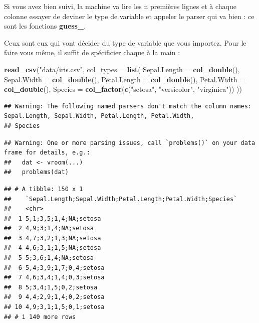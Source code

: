 \documentclass[
]{book}
\newenvironment{Shaded}{\begin{snugshade}}{\end{snugshade}}
\newcommand{\AttributeTok}[1]{\textcolor[rgb]{0.13,0.29,0.53}{#1}}
\newcommand{\FunctionTok}[1]{\textcolor[rgb]{0.13,0.29,0.53}{\textbf{#1}}}
\newcommand{\NormalTok}[1]{#1}
\newcommand{\StringTok}[1]{\textcolor[rgb]{0.31,0.60,0.02}{#1}}
\begin{document}
Si vous avez bien suivi, la machine va lire les n premières lignes et à chaque
colonne essayer de deviner le type de variable et appeler le parser qui va
bien : ce sont les fonctions \textbf{guess\_}.

Ceux sont eux qui vont décider du type de variable que vous importez. Pour le
faire vous même, il suffit de spécificier chaque à la main :

\begin{Shaded}
\begin{Highlighting}[]
\FunctionTok{read\_csv}\NormalTok{(}\StringTok{"data/iris.csv"}\NormalTok{, }\AttributeTok{col\_types =} \FunctionTok{list}\NormalTok{(}
  \AttributeTok{Sepal.Length =} \FunctionTok{col\_double}\NormalTok{(),}
  \AttributeTok{Sepal.Width =} \FunctionTok{col\_double}\NormalTok{(),}
  \AttributeTok{Petal.Length =} \FunctionTok{col\_double}\NormalTok{(),}
  \AttributeTok{Petal.Width =} \FunctionTok{col\_double}\NormalTok{(),}
  \AttributeTok{Species =} \FunctionTok{col\_factor}\NormalTok{(}\FunctionTok{c}\NormalTok{(}\StringTok{"setosa"}\NormalTok{, }\StringTok{"versicolor"}\NormalTok{, }\StringTok{"virginica"}\NormalTok{))}
\NormalTok{))}
\end{Highlighting}
\end{Shaded}

\begin{verbatim}
## Warning: The following named parsers don't match the column names: Sepal.Length, Sepal.Width, Petal.Length, Petal.Width,
## Species
\end{verbatim}

\begin{verbatim}
## Warning: One or more parsing issues, call `problems()` on your data frame for details, e.g.:
##   dat <- vroom(...)
##   problems(dat)
\end{verbatim}

\begin{verbatim}
## # A tibble: 150 x 1
##    `Sepal.Length;Sepal.Width;Petal.Length;Petal.Width;Species`
##    <chr>                                                      
##  1 5,1;3,5;1,4;NA;setosa                                      
##  2 4,9;3;1,4;NA;setosa                                        
##  3 4,7;3,2;1,3;NA;setosa                                      
##  4 4,6;3,1;1,5;NA;setosa                                      
##  5 5;3,6;1,4;NA;setosa                                        
##  6 5,4;3,9;1,7;0,4;setosa                                     
##  7 4,6;3,4;1,4;0,3;setosa                                     
##  8 5;3,4;1,5;0,2;setosa                                       
##  9 4,4;2,9;1,4;0,2;setosa                                     
## 10 4,9;3,1;1,5;0,1;setosa                                     
## # i 140 more rows
\end{verbatim}
\end{document}
